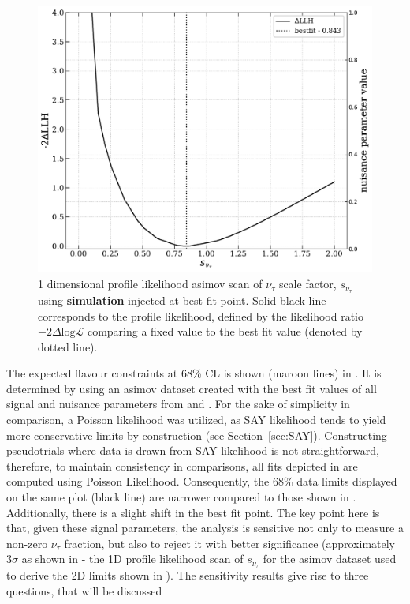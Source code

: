 \begin{figure}
    
    \includegraphics{./figures/results/simulation_profile_scan_astro_nutau_ratio.pdf}
    
    \caption[1D profile likelihood scan of $s_{\nu_{\tau}}$ using simulation]{1 dimensional profile likelihood asimov scan of $\nu_{\tau}$ scale factor, $s_{\nu_{\tau}}$ using \textbf{simulation} injected at best fit point. Solid black line corresponds to the profile likelihood, defined by the likelihood ratio $-2\Delta\mathrm{log}\mathcal{L}$ comparing a fixed value to the best fit value (denoted by dotted line).}

\end{figure}

The expected flavour constraints at 68\% CL is shown (maroon lines) in . It is determined by using an asimov dataset  created with the best fit values of all signal and nuisance parameters from  and . For the sake of simplicity in comparison, a Poisson likelihood was utilized, as SAY likelihood tends to yield more conservative limits by construction (see Section~\ref{sec:SAY}). Constructing pseudotrials where data is drawn from SAY likelihood is not straightforward, therefore, to maintain consistency in comparisons, all fits depicted in  are computed using Poisson Likelihood. Consequently, the 68\% data limits displayed on the same plot (black line) are narrower compared to those shown in . Additionally, there is a slight shift in the best fit point. The key point here is that, given these signal parameters, the analysis is sensitive not only to measure a non-zero $\nu_{\tau}$ fraction, but also to reject it with better significance (approximately $3\sigma$ as shown in  - the 1D profile likelihood scan of $s_{\nu_{\tau}}$ for the asimov dataset used to derive the 2D limits shown in ). The sensitivity results give rise to three questions, that will be discussed

